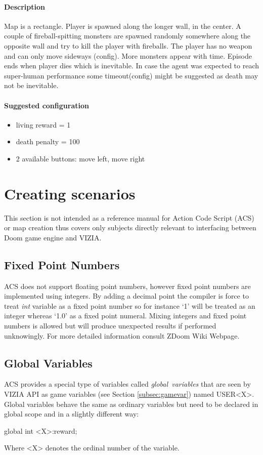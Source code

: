 \documentclass[english,bachelor,a4paper,twoside]{ppfcmthesis}
\begin{document}
		\paragraph{Description}
			Map is a rectangle. Player is spawned along the longer wall, in the center. A couple of fireball-spitting monsters are spawned randomly somewhere along the opposite wall and try to kill the player with fireballs. The player has no weapon and can only move sideways (config). More monsters appear with time. Episode ends when player dies which is inevitable. In case the agent was expected to reach super-human performance some timeout(config) might be suggested as death may not be inevitable.

		\paragraph{Suggested configuration}
		\begin{itemize}
			\item living reward = 1
			\item death penalty = 100
			\item 2 available buttons: move left, move right
		\end{itemize}
	\newpage

\section{Creating scenarios}\label{sec:creating_scenarios}
	This section is not intended as a reference manual for Action Code Script (ACS) or map creation thus covers only subjects directly relevant to interfacing between Doom game engine and VIZIA.


	\subsection{Fixed Point Numbers}\label{subsec:fixed_point}
		ACS does not support floating point numbers, however fixed point numbers are implemented using integers. By adding a decimal point the compiler is force to treat \emph{int} variable as a fixed point number so for instance `1' will be treated as an integer whereas `1.0' as a fixed point numeral. Mixing integers and fixed point numbers is allowed but will produce unexpected results if performed unknowingly. For more detailed information consult ZDoom Wiki Webpage\cite{zdoom-wiki}.

	\subsection{Global Variables}\label{subsec:global_variable}
		ACS provides a special type of variables called \emph{global~variables} that are seen by VIZIA API as game variables (see Section \ref{subsec:gamevar}) named USER<X>. Global variables behave the same as ordinary variables but need to be declared in global scope and in a slightly different way:
		\begin{clinee}
global int <X>:reward;
		\end{clinee}
		Where <X> denotes the ordinal number of the variable.
		
\end{document}
